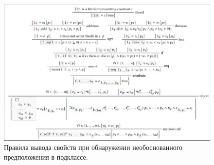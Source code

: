 \begin{figure}
  \includegraphics[width=\textwidth]{figs/properties}
  \caption{Правила вывода свойств при обнаружении необоснованного предположения в подклассе.}
  \label{fig:property_inference}
\end{figure}


